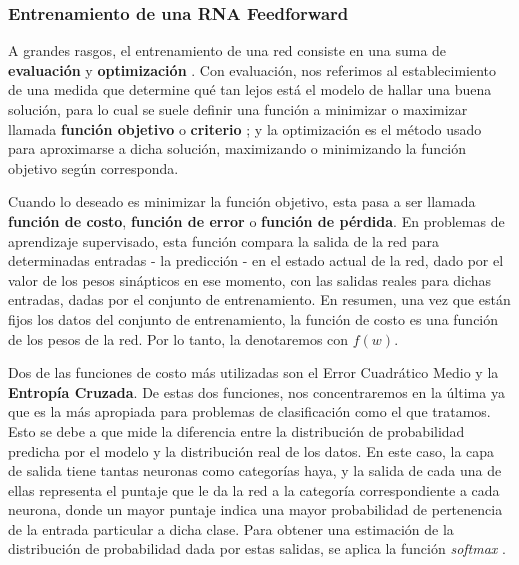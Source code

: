 \documentclass[../../main.tex]{subfiles}
\begin{document}
\subsubsection{Entrenamiento de una RNA Feedforward}
A grandes rasgos, el entrenamiento de una red consiste en una suma de \textbf{evaluación} y \textbf{optimización} \cite{pedro-domingos}. Con evaluación, nos referimos al establecimiento de una medida que determine qué tan lejos está el modelo de hallar una buena solución, para lo cual se suele definir una función a minimizar o maximizar llamada \textbf{función objetivo} o \textbf{criterio} \cite{deep-learning}; y la optimización es el método usado para aproximarse a dicha solución, maximizando o minimizando la función objetivo según corresponda.

Cuando lo deseado es minimizar la función objetivo, esta pasa a ser llamada \textbf{función de costo}, \textbf{función de error} o \textbf{función de pérdida}. En problemas de aprendizaje supervisado, esta función compara la salida de la red para determinadas entradas - la predicción - en el estado actual de la red, dado por el valor de los pesos sinápticos en ese momento, con las salidas reales para dichas entradas, dadas por el conjunto de entrenamiento. En resumen, una vez que están fijos los datos del conjunto de entrenamiento, la función de costo es una función de los pesos de la red. Por lo tanto, la denotaremos con \(f(w)\).

Dos de las funciones de costo más utilizadas son el Error Cuadrático Medio y la \textbf{Entropía Cruzada}. De estas dos funciones, nos concentraremos en la última ya que es la más apropiada para problemas de clasificación como el que tratamos. Esto se debe a que mide la diferencia entre la distribución de probabilidad predicha por el modelo y la distribución real de los datos.  En este caso, la capa de salida tiene tantas neuronas como categorías haya, y la salida de cada una de ellas representa el puntaje que le da la red a la categoría correspondiente a cada neurona, donde un mayor puntaje indica una mayor probabilidad de pertenencia de la entrada particular a dicha clase. Para obtener una estimación de la distribución de probabilidad dada por estas salidas, se aplica la función \textit{softmax} \cite{hands-on-ML-sklearn-tf}.
\end{document}
